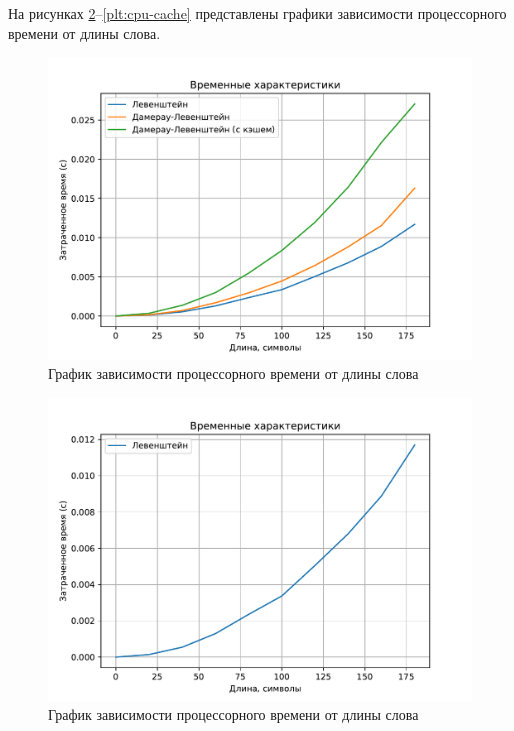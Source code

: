 На рисунках \ref{plt:cpu-lev}--\ref{plt:cpu-cache} представлены графики зависимости процессорного времени от длины слова.

\begin{figure}[H]
	\centering
	\includegraphics{assets/plots/cpu-matrix.pdf}
	\caption{График зависимости процессорного времени от длины слова}
	\label{plt:cpu-matrix}
\end{figure}

\begin{figure}[H]
	\centering
	\includegraphics{assets/plots/cpu-lev.pdf}
	\caption{График зависимости процессорного времени от длины слова}
	\label{plt:cpu-lev}
\end{figure}

